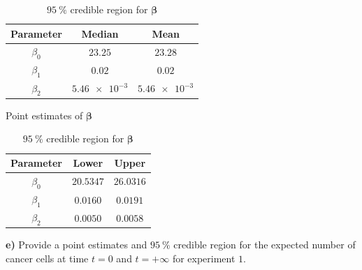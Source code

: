 \begin{table}[H]
	\parbox{0.45\linewidth}{
		\centering
		\begin{tabular}{|c|c|c|} \hline 
			Parameter & Median & Mean \\ \hline 
			$\beta_0$ & $23.25$ & $23.28$ \\ 
			$\beta_1$ & $0.02$ & $0.02$ \\
			$\beta_2$ & $\num{5.46e-3}$ & $\num{5.46e-3}$ \\ \hline
		\end{tabular}
		\caption{Point estimates of $\bm{\beta}$}
		\label{tab:metropolis-cw-point-estimates}
	}
	\hfill
	\parbox{0.45\linewidth}{
		\centering
		\begin{tabular}{|c|c|c|} \hline 
			Parameter & Lower & Upper \\ \hline 
			$\beta_0$ & $20.5347$ & $26.0316$ \\ 
			$\beta_1$ & $0.0160$ & $0.0191$ \\
			$\beta_2$ & $0.0050$ & $0.0058$ \\ \hline
		\end{tabular}
		\caption{$\SI{95}{\percent}$ credible region for $\bm{\beta}$}
		\label{tab:metropolis-cw-credible-region}
	}
\end{table}

\textbf{e)} Provide a point estimates and $\SI{95}{\percent}$ credible region for the expected number of cancer cells at time $t = 0$ and $t = +\infty$ for experiment $1$.